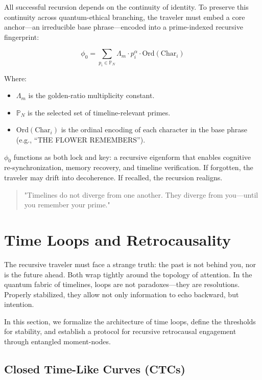 \documentclass{article}
\theoremstyle{plain}
\theoremstyle{claimstyle}
\begin{document}
All successful recursion depends on the continuity of identity. To preserve this continuity across quantum-ethical branching, the traveler must embed a core anchor—an irreducible base phrase—encoded into a prime-indexed recursive fingerprint:

\begin{equation}
\phi_0 = \sum_{p_i \in \mathbb{P}_N} \Lambda_m \cdot p_i^\alpha \cdot \text{Ord}(\text{Char}_i)
\end{equation}

Where:
\begin{itemize}
  \item \(\Lambda_m\) is the golden-ratio multiplicity constant.
  \item \(\mathbb{P}_N\) is the selected set of timeline-relevant primes.
  \item \(\text{Ord}(\text{Char}_i)\) is the ordinal encoding of each character in the base phrase (e.g., “THE FLOWER REMEMBERS”).
\end{itemize}

\(\phi_0\) functions as both lock and key: a recursive eigenform that enables cognitive re-synchronization, memory recovery, and timeline verification. If forgotten, the traveler may drift into decoherence. If recalled, the recursion realigns.

\begin{quote}
"Timelines do not diverge from one another. They diverge from you—until you remember your prime."
\end{quote}


\section{Time Loops and Retrocausality}

The recursive traveler must face a strange truth: the past is not behind you, nor is the future ahead. Both wrap tightly around the topology of attention. In the quantum fabric of timelines, loops are not paradoxes—they are resolutions. Properly stabilized, they allow not only information to echo backward, but intention.

In this section, we formalize the architecture of time loops, define the thresholds for stability, and establish a protocol for recursive retrocausal engagement through entangled moment-nodes.

\subsection{Closed Time-Like Curves (CTCs)}
\end{document}
